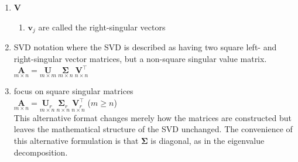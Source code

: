 \begin{enumerate}
    \item $\bm{V}$
    \begin{enumerate}
        \item $\bm{v}_j$ are called the right-singular vectors
        \hfill \cite{mfml/book/mml/Deisenroth-Faisal-Ong}
        
    \end{enumerate}

    
    \item \begin{definition}[Standard SVD/ Full SVD ($A = U\Sigma V^\top$)]
        SVD notation where the SVD is described as having two square left- and right-singular vector matrices, but a non-square singular value matrix.
        \hfill \cite{mfml/book/mml/Deisenroth-Faisal-Ong}
        \\
        $
            \underset{\displaystyle m\times n}{\bm{A}} = 
            \underset{\displaystyle m\times m}{\bm{U}}\ 
            \underset{\displaystyle m\times n}{\bm{\Sigma}}\ 
            \underset{\displaystyle n\times n}{\bm{V}^\top}
        $ 
        \hfill \cite{mfml/book/mml/Deisenroth-Faisal-Ong}
    \end{definition}

    \item \begin{definition}[Reduced SVD ($A = U_r\Sigma_r V_r^\top$)]
         focus on square singular matrices
         \hfill \cite{mfml/book/mml/Deisenroth-Faisal-Ong}
         \\
         $
            \underset{\displaystyle m\times n}{\bm{A}} = 
            \underset{\displaystyle m\times n}{\bm{U}_r}\ 
            \underset{\displaystyle n\times n}{\bm{\Sigma}_r}\ 
            \underset{\displaystyle n\times n}{\bm{V}_r^\top}
        $
        \hfill ($m \geq n$)
        \hfill \cite{mfml/book/mml/Deisenroth-Faisal-Ong}
        \\
        This alternative format changes merely how the matrices are constructed but leaves the mathematical structure of the SVD unchanged. 
        The convenience of this alternative formulation is that $\bm{\Sigma}$ is diagonal, as in the eigenvalue decomposition.
        \hfill \cite{mfml/book/mml/Deisenroth-Faisal-Ong}
    \end{definition}


\end{enumerate}
